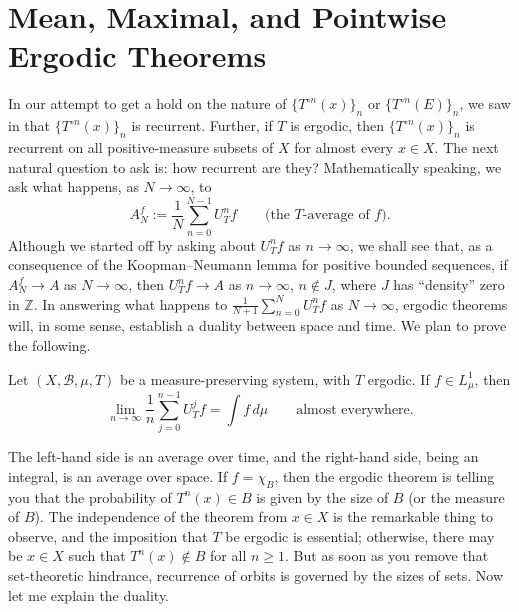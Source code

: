 \documentclass[11pt,a4paper]{article}
\begin{document}
\section*{Mean, Maximal, and Pointwise Ergodic Theorems}
In our attempt to get a hold on the nature of $\{T^{\circ n}(x)\}_n$ or
$\{T^{\circ n}(E)\}_n$, we saw in  that $\{T^{\circ n}(x)\}_n$ is recurrent.
Further, if $T$ is ergodic, then $\{T^{\circ n}(x)\}_n$ is recurrent on all
positive-measure subsets of $X$ for almost every $x\in X$. The next natural
question to ask is: how recurrent are they? Mathematically speaking, we ask
what happens, as $N\to\infty$, to
\[
  A_N^f:=\frac1N\sum_{n=0}^{N-1}U_T^n f
  \qquad\text{(the $T$-average of $f$).}
\]
Although we started off by asking about $U_T^n f$ as $n\to\infty$, we shall
see that, as a consequence of the Koopman--Neumann lemma for positive bounded
sequences, if $A_N^f\to A$ as $N\to\infty$, then $U_T^n f\to A$ as
$n\to\infty$, $n\notin J$, where $J$ has ``density'' zero in $\mathbb Z$.
In answering what happens to $\frac1{N+1}\sum_{n=0}^{N}U_T^n f$ as
$N\to\infty$, ergodic theorems will, in some sense, establish a duality
between space and time. We plan to prove the following.

\setcounter{theorem}{8}\begin{theorem}[Birkhoff]
\label{thm:birkhoff}
Let $(X,\mathcal B,\mu,T)$ be a measure-preserving system, with $T$ ergodic.
If $f\in L^1_\mu$, then
\[
  \lim_{n\to\infty}\frac1n\sum_{j=0}^{n-1}U_T^j f=\int f\,d\mu
  \qquad\text{almost everywhere.}
\]
\end{theorem}

The left-hand side is an average over time, and the right-hand side, being
an integral, is an average over space. If $f=\chi_B$, then the ergodic
theorem is telling you that the probability of $T^n(x)\in B$ is given by
the size of $B$ (or the measure of $B$). The independence of the theorem from
$x\in X$ is the remarkable thing to observe, and the imposition that
$T$ be ergodic is essential; otherwise, there may be $x\in X$ such that
$T^n(x)\notin B$ for all $n\geq1$. But as soon as you remove that
set-theoretic hindrance, recurrence of orbits is governed by the sizes of
sets. Now let me explain the duality.
\end{document}
